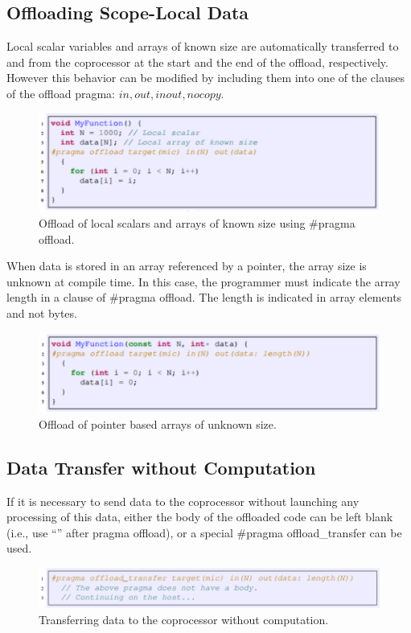 \documentclass[12pt]{article}
\begin{document}
\subsection{Offloading Scope-Local Data}
Local scalar variables and arrays of known size are automatically transferred to and from the coprocessor at the start and the end of the offload, respectively. However this behavior can be modified by including them into one of the clauses of the offload pragma: $in, out, inout, nocopy$.
\begin{figure}[H]
\centering
\includegraphics[scale = 0.9]{chainer11.png}
\caption{Offload of local scalars and arrays of known size using \#pragma offload.}
\end{figure}

When data is stored in an array referenced by a pointer, the array size is unknown at compile time. In this case, the programmer must indicate the array length in a clause of \#pragma offload. The length is indicated in array elements and not bytes.
\begin{figure}[H]
\centering
\includegraphics[scale = 0.9]{chainer12.png}
\caption{Offload of pointer based arrays of unknown size.}
\end{figure}
\subsection{Data Transfer without Computation}
If it is necessary to send data to the coprocessor without launching any processing of this data, either the body of the offloaded code can be left blank (i.e., use “{}” after pragma offload), or a special \#pragma offload\_transfer can be used.
\begin{figure}[H]
\centering
\includegraphics[scale = 0.9]{chainer13.png}
\caption{Transferring data to the coprocessor without computation.}
\end{figure}
\end{document}
